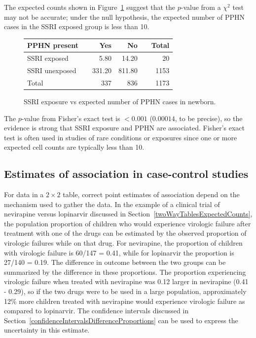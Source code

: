The expected counts shown in Figure~\ref{ssriPPHNExpected} suggest that the $p$-value from a $\chi^2$ test may not be accurate; under the null hypothesis, the expected number of PPHN cases in the SSRI exposed group is less than 10.

 \begin{figure}[h]
	\centering
	\begin{tabular}{ll rrr r}
		\hline
		PPHN present  & \hspace{2mm} & Yes & No & \hspace{2mm} & Total \\
		\hline
		SSRI exposed &	& 5.80 & 14.20 &  & 20  \\
		SSRI unexposed & & 331.20 & 811.80 &  & 1153  \\
        Total & & 337 & 836 & & 1173 \\
		\hline
	\end{tabular}
    \caption{SSRI exposure vs expected number of PPHN cases in newborn.}
    \label{ssriPPHNExpected}
\end{figure}	

The $p$-value from Fisher's exact test is $< 0.001$ ($0.00014$, to be precise), so the evidence is strong that SSRI exposure and PPHN are associated. Fisher's exact test is often used in studies of rare conditions or exposures since one or more expected cell counts are typically less than 10.



\textD{\newpage}


\subsection{Estimates of association in case-control studies}
\label{caseControlStudiesEstimates}


For data in a $2 \times 2$ table, correct point estimates of association depend on the mechanism used to gather the data.  In the example of a clinical trial of nevirapine versus lopinarvir discussed in Section~\ref{twoWayTablesExpectedCounts}, the population proportion of children who would experience virologic failure after treatment with one of the drugs can be estimated by the observed proportion of virologic failures while on that drug. For nevirapine, the proportion of children with virologic failure is 60/147 = 0.41, while for lopinarvir the proportion is 27/140 = 0.19.  The difference in outcome between the two groups can be summarized by the difference in these proportions. The proportion experiencing virologic failure when treated with nevirapine was 0.12 larger in nevirapine (0.41 - 0.29), so if the two drugs were to be used in a large population, approximately 12\% more children treated with nevirapine would experience virologic failure as compared to lopinarvir. The confidence intervals discussed in Section~\ref{confidenceIntervalsDifferenceProportions} can be used to express the uncertainty in this estimate.

